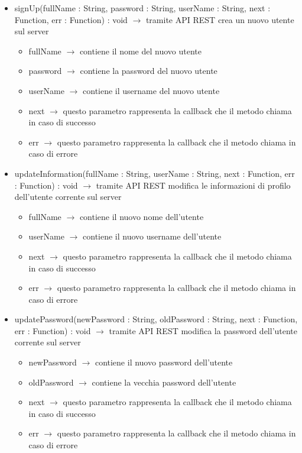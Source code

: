 \begin{description}
\begin{itemize}
	\item signUp(fullName : String, password : String, userName : String, next : Function, err : Function) : void $\rightarrow$ tramite API REST crea un nuovo utente sul server\begin{itemize}
		\item fullName $\rightarrow$ contiene il nome del nuovo utente
		\item password $\rightarrow$ contiene la password del nuovo utente
		\item userName $\rightarrow$ contiene il username del nuovo utente
		\item next $\rightarrow$ questo parametro rappresenta la callback che il metodo chiama in caso di successo
		\item err $\rightarrow$ questo parametro rappresenta la callback che il metodo chiama in caso di errore
	\end{itemize}
	
	\item updateInformation(fullName : String, userName : String, next : Function, err : Function) : void $\rightarrow$ tramite API REST modifica le informazioni di profilo dell'utente corrente sul server\begin{itemize}
		\item fullName $\rightarrow$ contiene il nuovo nome dell'utente
		\item userName $\rightarrow$ contiene il nuovo username dell'utente
		\item next $\rightarrow$ questo parametro rappresenta la callback che il metodo chiama in caso di successo
		\item err $\rightarrow$ questo parametro rappresenta la callback che il metodo chiama in caso di errore
	\end{itemize}
	
	\item updatePassword(newPassword : String, oldPassword : String, next : Function, err : Function) : void $\rightarrow$ tramite API REST modifica la password dell'utente corrente sul server\begin{itemize}
		\item newPassword $\rightarrow$ contiene il nuovo password dell'utente
		\item oldPassword $\rightarrow$ contiene la vecchia password dell'utente
		\item next $\rightarrow$ questo parametro rappresenta la callback che il metodo chiama in caso di successo
		\item err $\rightarrow$ questo parametro rappresenta la callback che il metodo chiama in caso di errore
	\end{itemize}
	

\end{itemize}
\end{description}
